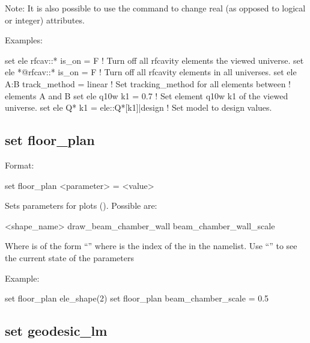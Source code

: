{{Note: It is also possible to use the  command to change real (as opposed to
logical or integer) attributes.

Examples:
\begin{example}
  set ele rfcav::* is_on = F         ! Turn off all rfcavity elements the viewed universe.
  set ele *@rfcav::* is_on = F       ! Turn off all rfcavity elements in all universes.
  set ele A:B track_method = linear  ! Set tracking_method for all elements between 
                                     !   elements A and B
  set ele q10w k1 = 0.7              ! Set element q10w k1 of the viewed universe.
  set ele Q* k1 = ele::Q*[k1]|design ! Set model to design values.
\end{example}


\subsection{set floor_plan}
\label{s:set.floor.plan}

Format:
\begin{example}
  set floor_plan <parameter> = <value>
\end{example}


Sets parameters for  plots ().  Possible  are:
\begin{example}
  <shape_name>%
  draw_beam_chamber_wall
  beam_chamber_wall_scale
\end{example}
Where  is of the form ``'' where  is the index of
the  in the  namelist.  Use ``'' to
see the current state of the  parameters

Example:
\begin{example}
  set floor_plan ele_shape(2)%
  set floor_plan beam_chamber_scale = 0.5
\end{example}


\subsection{set geodesic_lm}
\label{s:set.geodesic.lm}

}}
